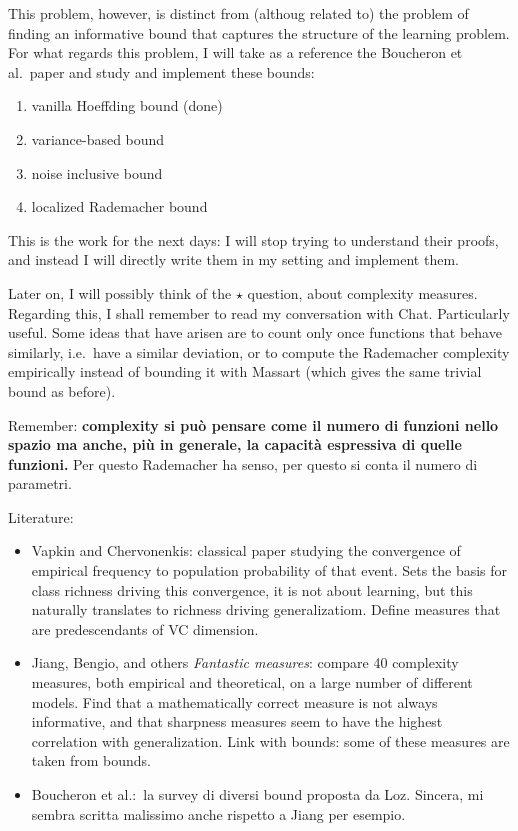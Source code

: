 \documentclass{amsart}
\begin{document}
This problem, however, is distinct from (althoug related to) the problem of finding an informative bound that captures the structure of the learning problem. For what regards this problem, I will take as a reference the Boucheron et al.\ paper and study and implement these bounds:
\begin{enumerate}
    \item vanilla Hoeffding bound (done)
    \item variance-based bound
    \item noise inclusive bound
    \item localized Rademacher bound
\end{enumerate}
This is the work for the next days: I will stop trying to understand their proofs, and instead I will directly write them in my setting and implement them. 


Later on, I will possibly think of the $\star$ question, about complexity measures. Regarding this, I shall remember to read my conversation with Chat. Particularly useful. Some ideas that have arisen are to count only once functions that behave similarly, i.e.\ have a similar deviation, or to compute the Rademacher complexity empirically instead of bounding it with Massart (which gives the same trivial bound as before). 


Remember: {\bf complexity si può pensare come il numero di funzioni nello spazio ma anche, più in generale, la capacità espressiva di quelle funzioni.} Per questo Rademacher ha senso, per questo si conta il numero di parametri. 


Literature:
\begin{itemize}
    \item Vapkin and Chervonenkis: classical paper studying the convergence of empirical frequency to population probability of that event. Sets the basis for class richness driving this convergence, it is not about learning, but this naturally translates to richness driving generalizatiom. Define measures that are predescendants of VC dimension. 
    \item Jiang, Bengio, and others {\it Fantastic measures\/}: compare 40 complexity measures, both empirical and theoretical, on a large number of different models. Find that a mathematically correct measure is not always informative, and that sharpness measures seem to have the highest correlation with generalization. Link with bounds: some of these measures are taken from bounds. 
    \item Boucheron et al.:\ la survey di diversi bound proposta da Loz. Sincera, mi sembra scritta malissimo anche rispetto a Jiang per esempio. 
\end{itemize}
\end{document}
